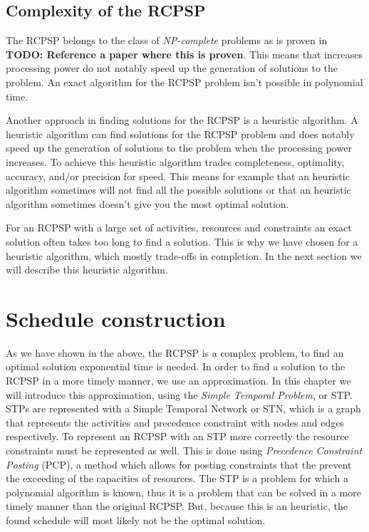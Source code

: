 \documentclass{article}
\theoremstyle{definition}
\newcommand{\TODO}[1]{{\color{red}\textbf{TODO: #1}}}
\begin{document}
\subsection{Complexity of the RCPSP}
\label{text:complex}
The RCPSP belongs to the class of \emph{NP-complete} problems as is proven in \TODO{Reference a paper where this is proven}.
This means that increases processing power do not notably speed up the generation of solutions to the problem.
An exact algorithm for the RCPSP problem isn't possible in polynomial time.

Another approach in finding solutions for the RCPSP is a heuristic algorithm.
A heuristic algorithm can find solutions for the RCPSP problem and does notably speed up the generation of solutions to the problem when the processing power increases.
To achieve this heuristic algorithm trades completeness, optimality, accuracy, and/or precision for speed.
This means for example that an heuristic algorithm sometimes will not find all the possible solutions or that an heuristic algorithm sometimes doesn't give you the most optimal solution.

For an RCPSP with a large set of activities, resources and constraints an exact solution often takes too long to find a solution.
This is why we have chosen for a heuristic algorithm, which mostly trade-offs in completion.
In the next section we will describe this heuristic algorithm.


\newpage


\section{Schedule construction}
\label{text:schedule}

As we have shown in the above, the RCPSP is a complex problem, to find an optimal solution exponential time is needed.
In order to find a solution to the RCPSP in a more timely manner, we use an approximation.
In this chapter we will introduce this approximation, using the \emph{Simple Temporal Problem}, or STP.
STPs are represented with a Simple Temporal Network or STN, which is a graph that represents the activities and precedence constraint with nodes and edges respectively.
To represent an RCPSP with an STP more correctly the resource constraints must be represented as well. 
This is done using \emph{Precedence Constraint Posting} (PCP), a method which allows for posting constraints that the prevent the exceeding of the capacities of resources.
The STP is a problem for which a polynomial algorithm is known, thus it is a problem that can be solved in a more timely manner than the original RCPSP.
But, because this is an heuristic, the found schedule will most likely not be the optimal solution.
\end{document}
